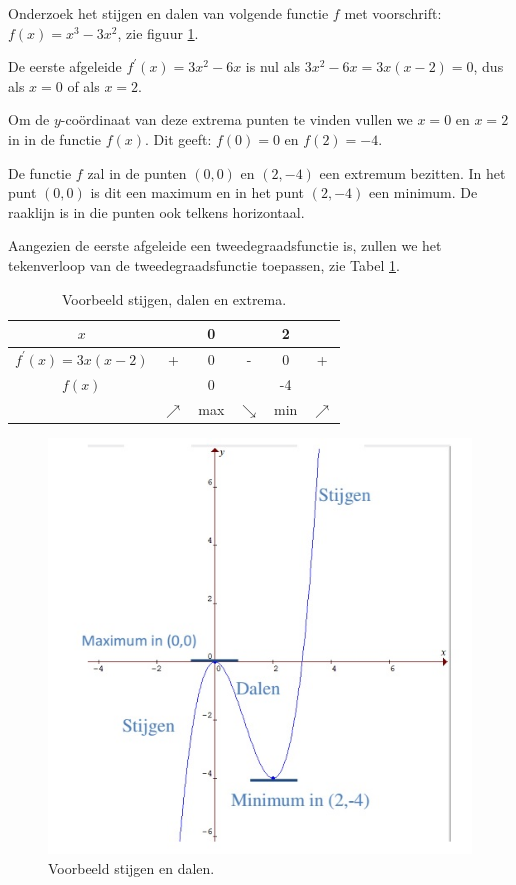 \begin{voorbeeld}
	Onderzoek het stijgen en dalen van volgende functie $f$ met voorschrift: $f(x)=x^{3}-3x^{2}$, zie figuur \ref{fig:vb2}.

De eerste afgeleide $f^{'}(x)=3x^{2}-6x$ is nul als $3x^{2}-6x=3x(x-2)=0$, dus als $x=0$ of als $x=2$.

Om de $y$-co\"ordinaat van deze extrema punten te vinden
vullen we $x=0$ en $x=2$ in in de functie $f(x)$. Dit geeft: $f(0)=0$
en $f(2)=-4$.

De functie $f$ zal in de punten $(0,0)$ en $(2,-4)$ een
extremum bezitten. In het punt $(0,0)$ is dit een maximum en in het
punt $(2,-4)$ een minimum. De raaklijn is in die punten ook telkens
horizontaal.

Aangezien de eerste afgeleide een tweedegraadsfunctie is,
zullen we het tekenverloop van de tweedegraadsfunctie toepassen, zie Tabel \ref{tab:stijgen}.

\begin{table}
	\centering
	\begin{tabular}{c||c|c|c|c|c}
		$x$ &  & 0 &  & 2 & \tabularnewline
		\hline 
		$f^{'}(x)=3x(x-2)$ & + & 0 & - & 0 & + \\
		\hline 
		$f(x)$ &  & 0 &  & -4 & \\
		& $\nearrow$ & max & $\searrow$ & min & $\nearrow$ \\
	\end{tabular}
\caption{Voorbeeld stijgen, dalen en extrema.}
\label{tab:stijgen}
\end{table}

\begin{figure}[h]
\centering{}\includegraphics[width=.7\linewidth]{2_elem_rekenvaardigheden_B/inputs/verloop_vb2.jpg}
\caption{Voorbeeld stijgen en dalen.}
\label{fig:vb2}
\end{figure}

\end{voorbeeld}


